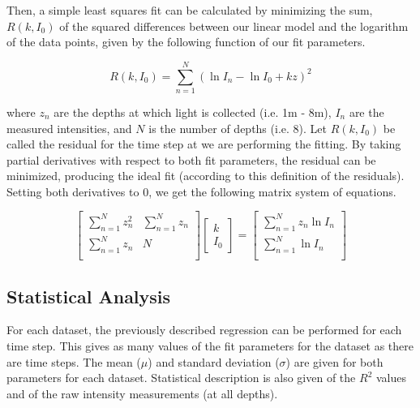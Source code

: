 Then, a simple least squares fit can be calculated by minimizing the sum, $R(k,I_0)$ of the squared differences between our linear model and the logarithm of the data points, given by the following function of our fit parameters.

\begin{equation}
	R(k,I_0) = \sum_{n=1}^N (\ln I_n - \ln I_0 + kz)^2
	\label{resid}
\end{equation}

where $z_n$ are the depths at which light is collected (i.e. 1m - 8m), $I_n$ are the measured intensities, and $N$ is the number of depths (i.e. 8). Let $R(k,I_0)$ be called the residual for the time step at we are performing the fitting. By taking partial derivatives with respect to both fit parameters, the residual can be minimized, producing the ideal fit (according to this definition of the residuals). Setting both derivatives to 0, we get the following matrix system of equations.

\newcommand\xls{z_n}
\newcommand\yls{\ln I_n}
\begin{equation}
	\begin{bmatrix}
		\sum_{n=1}^N \xls^2 & \sum_{n=1}^N \xls \\
		\sum_{n=1}^N \xls   & N \\
	\end{bmatrix}
%
	\begin{bmatrix}
		k \\
		I_0
	\end{bmatrix}
%
	=
%
	\begin{bmatrix}
		\sum_{n=1}^N \xls\yls \\
		\sum_{n=1}^N \yls \\
	\end{bmatrix}
	\label{lstsq}
\end{equation}

\subsection{Statistical Analysis}
\label{stats}
For each dataset, the previously described regression can be performed for each time step. This gives as many values of the fit parameters for the dataset as there are time steps. The mean ($\mu$) and standard deviation ($\sigma$) are given for both parameters for each dataset. Statistical description is also given of the $R^2$ values and of the raw intensity measurements (at all depths). \\

